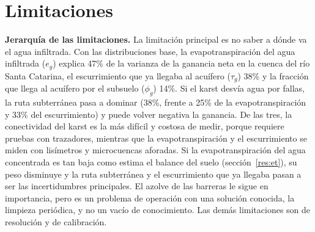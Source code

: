 \documentclass[11pt,letterpaper]{article}
\begin{document}
\section{Limitaciones}

\textbf{Jerarquía de las limitaciones.} La limitación principal es no saber a dónde va el agua infiltrada. Con las distribuciones base, la evapotranspiración del agua infiltrada ($e_g$) explica 47\% de la varianza de la ganancia neta en la cuenca del río Santa Catarina, el escurrimiento que ya llegaba al acuífero ($\tau_g$) 38\% y la fracción que llega al acuífero por el subsuelo ($\phi_g$) 14\%. Si el karst desvía agua por fallas, la ruta subterránea pasa a dominar (38\%, frente a 25\% de la evapotranspiración y 33\% del escurrimiento) y puede volver negativa la ganancia. De las tres, la conectividad del karst es la más difícil y costosa de medir, porque requiere pruebas con trazadores, mientras que la evapotranspiración y el escurrimiento se miden con lisímetros y microcuencas aforadas. Si la evapotranspiración del agua concentrada es tan baja como estima el balance del suelo (sección~\ref{res:et}), su peso disminuye y la ruta subterránea y el escurrimiento que ya llegaba pasan a ser las incertidumbres principales. El azolve de las barreras le sigue en importancia, pero es un problema de operación con una solución conocida, la limpieza periódica, y no un vacío de conocimiento. Las demás limitaciones son de resolución y de calibración.
\end{document}
